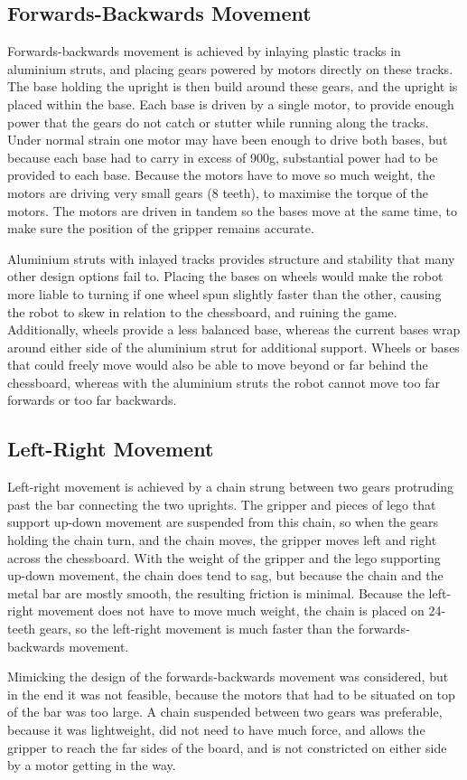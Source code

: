 \documentclass[onecolumn]{IEEEtran}
\begin{document}
\subsection{Forwards-Backwards Movement}
Forwards-backwards movement is achieved by inlaying plastic tracks in aluminium struts, and placing gears powered by motors directly on these tracks. The base holding the upright is then build around these gears, and the upright is placed within the base. Each base is driven by a single motor, to provide enough power that the gears do not catch or stutter while running along the tracks. Under normal strain one motor may have been enough to drive both bases, but because each base had to carry in excess of 900g, substantial power had to be provided to each base. Because the motors have to move so much weight, the motors are driving very small gears (8 teeth), to maximise the torque of the motors. The motors are driven in tandem so the bases move at the same time, to make sure the position of the gripper remains accurate. \par
Aluminium struts with inlayed tracks provides structure and stability that many other design options fail to. Placing the bases on wheels would make the robot more liable to turning if one wheel spun slightly faster than the other, causing the robot to skew in relation to the chessboard, and ruining the game. Additionally, wheels provide a less balanced base, whereas the current bases wrap around either side of the aluminium strut for additional support. Wheels or bases that could freely move would also be able to move beyond or far behind the chessboard, whereas with the aluminium struts the robot cannot move too far forwards or too far backwards. \par
\subsection{Left-Right Movement}
Left-right movement is achieved by a chain strung between two gears protruding past the bar connecting the two uprights. The gripper and pieces of lego that support up-down movement are suspended from this chain, so when the gears holding the chain turn, and the chain moves, the gripper moves left and right across the chessboard. With the weight of the gripper and the lego supporting up-down movement, the chain does tend to sag, but because the chain and the metal bar are mostly smooth, the resulting friction is minimal. Because the left-right movement does not have to move much weight, the chain is placed on 24-teeth gears, so the left-right movement is much faster than the forwards-backwards movement. \par
Mimicking the design of the forwards-backwards movement was considered, but in the end it was not feasible, because the motors that had to be situated on top of the bar was too large. A chain suspended between two gears was preferable, because it was lightweight, did not need to have much force, and allows the gripper to reach the far sides of the board, and is not constricted on either side by a motor getting in the way. \par
\end{document}
